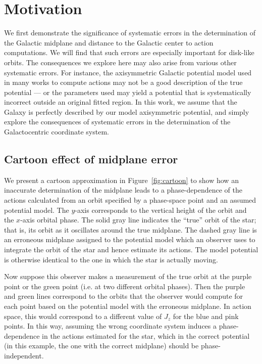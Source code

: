 \documentclass[twocolumn]{aastex62}
\begin{document}
\section{Motivation} \label{sec:ref_frame}
We first demonstrate the significance of systematic errors in the
determination of the Galactic midplane and distance to the Galactic center to
action computations. We will find that such errors are especially important
for disk-like orbits. The consequences we explore here may also arise from
various other systematic errors. For instance, the axisymmetric Galactic
potential model used in many works to compute actions may not be a good
description of the true potential --- or the parameters used may yield a
potential that is systematically incorrect outside an original fitted region.
In this work, we assume that the Galaxy is perfectly described by our model
axisymmetric potential, and simply explore the consequences of systematic
errors in the determination of the Galactocentric coordinate system.

\subsection{Cartoon effect of midplane error} \label{ssec:cartoon}
We present a cartoon approximation in Figure~\ref{fig:cartoon} to show how an
inaccurate determination of the midplane leads to a phase-dependence of the
actions calculated from an orbit specified by a phase-space point and an
assumed potential model. The $y$-axis corresponds to the vertical height of
the orbit and the $x$-axis orbital phase. The solid gray line indicates the
``true'' orbit of the star; that is, its orbit as it oscillates around the
true midplane. The dashed gray line is an erroneous midplane assigned to the
potential model which an observer uses to integrate the orbit of the star and
hence estimate its actions. The model potential is otherwise identical to the
one in which the star is actually moving.

Now suppose this observer makes a measurement of the true orbit at the purple
point or the green point (i.e. at two different orbital phases). Then the
purple and green lines correspond to the orbits that the observer would
compute for each point based on the potential model with the erroneous
midplane. In action space, this would correspond to a different value of $J_z$
for the blue and pink points. In this way, assuming the wrong coordinate
system induces a phase-dependence in the actions estimated for the star, which
in the correct potential (in this example, the one with the correct midplane)
should be phase-independent.
\end{document}
